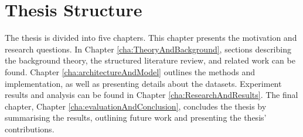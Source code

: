 \section{Thesis Structure}
\label{sec:thesisStructure}
The thesis is divided into five chapters. This chapter presents the motivation and research questions. In Chapter \ref{cha:TheoryAndBackground}, sections describing the background theory, the structured literature review, and related work can be found. Chapter \ref{cha:architectureAndModel} outlines the methods and implementation, as well as presenting details about the datasets. Experiment results and analysis can be found in Chapter \ref{cha:ResearchAndResults}. The final chapter, Chapter \ref{cha:evaluationAndConclusion}, concludes the thesis by summarising the results, outlining future work and presenting the thesis' contributions.